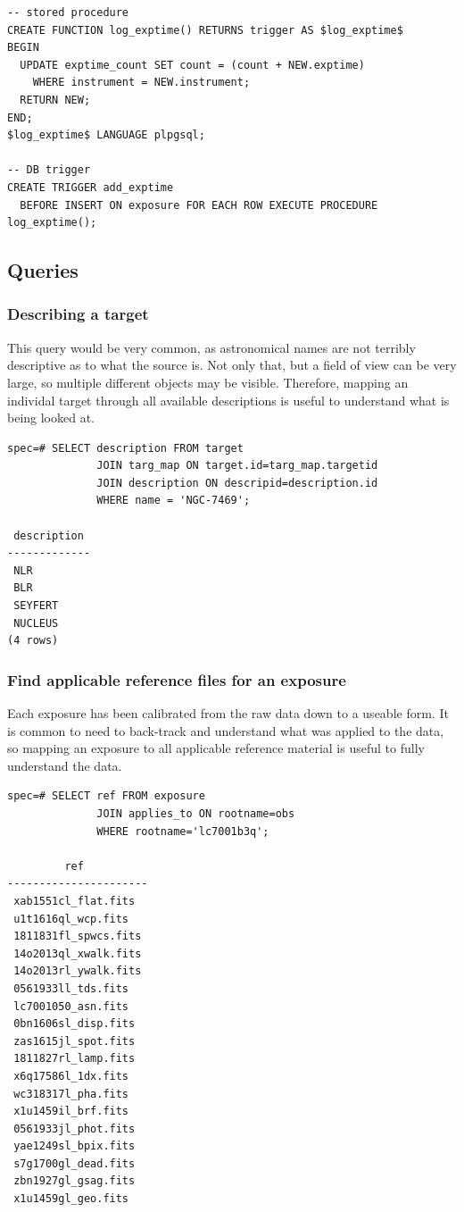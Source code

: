 \documentclass[a4paper,11pt]{article}
\begin{document}
\begin{verbatim}
-- stored procedure
CREATE FUNCTION log_exptime() RETURNS trigger AS $log_exptime$
BEGIN
  UPDATE exptime_count SET count = (count + NEW.exptime)
    WHERE instrument = NEW.instrument;
  RETURN NEW;
END;
$log_exptime$ LANGUAGE plpgsql;
  
-- DB trigger
CREATE TRIGGER add_exptime
  BEFORE INSERT ON exposure FOR EACH ROW EXECUTE PROCEDURE log_exptime();
\end{verbatim}

\subsection{Queries}
\subsubsection{Describing a target}
This query would be very common, as astronomical names are not terribly descriptive as to what the source is.  Not only that, but a field of view can be very large, so multiple different objects may be visible.  Therefore, mapping an individal target through all available descriptions is useful to understand what is being looked at. 

\begin{verbatim}
spec=# SELECT description FROM target 
              JOIN targ_map ON target.id=targ_map.targetid 
              JOIN description ON descripid=description.id 
              WHERE name = 'NGC-7469';
			
 description 
-------------
 NLR
 BLR
 SEYFERT
 NUCLEUS
(4 rows)
\end{verbatim}

\subsubsection{Find applicable reference files for an exposure}
Each exposure has been calibrated from the raw data down to a useable form.  It is common to need to back-track and understand what was applied to the data, so mapping an exposure to all applicable reference material is useful to fully understand the data.

\begin{verbatim}
spec=# SELECT ref FROM exposure 
              JOIN applies_to ON rootname=obs 
              WHERE rootname='lc7001b3q';
			
         ref          
----------------------
 xab1551cl_flat.fits
 u1t1616ql_wcp.fits
 1811831fl_spwcs.fits
 14o2013ql_xwalk.fits
 14o2013rl_ywalk.fits
 0561933ll_tds.fits
 lc7001050_asn.fits
 0bn1606sl_disp.fits
 zas1615jl_spot.fits
 1811827rl_lamp.fits
 x6q17586l_1dx.fits
 wc318317l_pha.fits
 x1u1459il_brf.fits
 0561933jl_phot.fits
 yae1249sl_bpix.fits
 s7g1700gl_dead.fits
 zbn1927gl_gsag.fits
 x1u1459gl_geo.fits
\end{verbatim}
\end{document}
